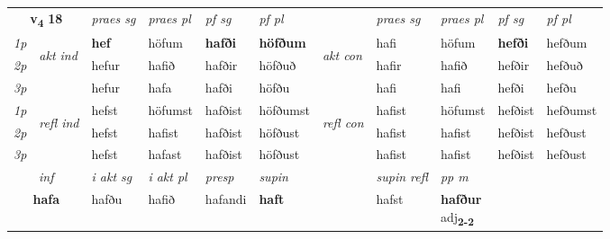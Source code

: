\noindent
\begin{tabular}{lllllllllll} \toprule
\multicolumn{2}{c}{\textbf{v{\textsubscript{4}}} \Large{\textbf{18}}}  &  \textit{praes sg}  & \textit{praes pl}  &\textit{ pf sg} & \textit{pf pl} &  &  \textit{praes sg}  & \textit{praes pl}  & \textit{pf sg} & \textit{pf pl } \\*
	\cmidrule{3-6} \cmidrule{8-11}
 {\textit{1p}} & \multirow{3}{*}{\begin{turn}{90}\textit{akt ind}\end{turn}} & \textbf{hef} & höfum & \textbf{hafði} & \textbf{höfðum} & \multirow{3}{*}{\begin{turn}{90}\textit{akt con}\end{turn}} &hafi & höfum & \textbf{hefði} & hefðum\\*
 {\textit{2p}} &  &  hefur  & hafið & hafðir & höfðuð & & hafir & hafið & hefðir & hefðuð \\*
{\textit{3p}} &  & hefur & hafa & hafði & höfðu & & hafi & hafi& hefði & hefðu \\*
\cmidrule{3-6} \cmidrule{8-11}
 {\textit{1p}} & \multirow{3}{*}{\begin{turn}{90}\textit{refl ind}\end{turn}}  & hefst & höfumst & hafðist & höfðumst & \multirow{3}{*}{\begin{turn}{90}\textit{refl con}\end{turn}}  &hafist & höfumst & hefðist & hefðumst \\*
 {\textit{2p}} &  & hefst & hafist & hafðist & höfðust & &hafist & hafist & hefðist & hefðust \\*
 {\textit{3p}}  & & hefst & hafast & hafðist & höfðust & & hafist & hafist& hefðist & hefðust \\*
\cmidrule{3-6} \cmidrule{8-11}

   \multicolumn{2}{c}{\textit{inf}}  & \textit{i akt sg} & \textit{i akt pl}   & \textit{presp} & \textit{supin} && \textit{supin refl} & \textit{pp m} \\*
  \multicolumn{2}{c}{\textbf{hafa}} & hafðu  & hafið   & hafandi &  \textbf{haft} && hafst & \specialcell{\textbf{hafður} \\ adj\textbf{\textsubscript{2-2}}} \\*
\end{tabular}

